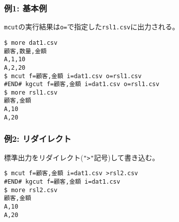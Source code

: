 \subsubsection*{例1: 基本例}

\verb|mcut|の実行結果は\verb|o=|で指定した\verb|rsl1.csv|に出力される。


\begin{Verbatim}[baselinestretch=0.7,frame=single]
$ more dat1.csv
顧客,数量,金額
A,1,10
A,2,20
$ mcut f=顧客,金額 i=dat1.csv o=rsl1.csv
#END# kgcut f=顧客,金額 i=dat1.csv o=rsl1.csv
$ more rsl1.csv
顧客,金額
A,10
A,20
\end{Verbatim}
\subsubsection*{例2: リダイレクト}

標準出力をリダイレクト(\verb|">"|記号)して書き込む。


\begin{Verbatim}[baselinestretch=0.7,frame=single]
$ mcut f=顧客,金額 i=dat1.csv >rsl2.csv
#END# kgcut f=顧客,金額 i=dat1.csv
$ more rsl2.csv
顧客,金額
A,10
A,20
\end{Verbatim}
